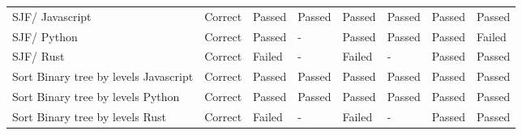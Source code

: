 \begin{table}[]
{\begin{tabular}{llllllll}
{\color[HTML]{434343} SJF/ Javascript} &
  {\color[HTML]{434343} Correct} &
  {\color[HTML]{434343} Passed} &
  {\color[HTML]{434343} Passed} &
  {\color[HTML]{434343} Passed} &
  {\color[HTML]{434343} Passed} &
  {\color[HTML]{434343} Passed} &
  {\color[HTML]{434343} Passed} \\
{\color[HTML]{434343} SJF/ Python} &
  {\color[HTML]{434343} Correct} &
  {\color[HTML]{434343} Passed} &
  {\color[HTML]{FF0000} -} &
  {\color[HTML]{434343} Passed} &
  {\color[HTML]{434343} Passed} &
  {\color[HTML]{434343} Passed} &
  {\color[HTML]{FF0000} Failed} \\
{\color[HTML]{434343} SJF/ Rust} &
  {\color[HTML]{434343} Correct} &
  {\color[HTML]{FF0000} Failed} &
  {\color[HTML]{434343} -} &
  {\color[HTML]{FF0000} Failed} &
  {\color[HTML]{434343} -} &
  {\color[HTML]{434343} Passed} &
  {\color[HTML]{434343} Passed} \\
{\color[HTML]{434343} Sort Binary tree by levels Javascript} &
  {\color[HTML]{434343} Correct} &
  {\color[HTML]{434343} Passed} &
  {\color[HTML]{434343} Passed} &
  {\color[HTML]{434343} Passed} &
  {\color[HTML]{434343} Passed} &
  {\color[HTML]{434343} Passed} &
  {\color[HTML]{434343} Passed} \\
{\color[HTML]{434343} Sort Binary tree by levels Python} &
  {\color[HTML]{434343} Correct} &
  {\color[HTML]{434343} Passed} &
  {\color[HTML]{434343} Passed} &
  {\color[HTML]{434343} Passed} &
  {\color[HTML]{434343} Passed} &
  {\color[HTML]{434343} Passed} &
  {\color[HTML]{434343} Passed} \\
{\color[HTML]{434343} Sort Binary tree by levels Rust} &
  {\color[HTML]{434343} Correct} &
  {\color[HTML]{FF0000} Failed} &
  {\color[HTML]{434343} -} &
  {\color[HTML]{FF0000} Failed} &
  {\color[HTML]{434343} -} &
  {\color[HTML]{434343} Passed} &
  {\color[HTML]{434343} Passed}
\end{tabular}%
}
\end{table}